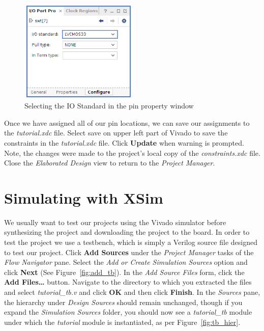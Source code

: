 \documentclass[11pt]{article}
\begin{document}
\begin{figure}[!h]
    \centering
    \includegraphics[width=0.5\textwidth]{images/io_std.png}
    \caption{Selecting the IO Standard in the pin property window}
    \label{fig:io_std}
\end{figure}

Once we have assigned all of our pin locations, we can save our assignments to the \textit{tutorial.xdc} file. Select save on upper left part of Vivado to save the constraints in the \textit{tutorial.xdc} file. Click \textbf{Update} when warning is prompted. Note, the changes were made to the project's local copy of the \textit{constraints.xdc} file. Close the \textit{Elaborated Design} view to return to the \textit{Project Manager}.




\section{Simulating with XSim}
\label{sec:simulation}
We usually want to test our projects using the Vivado simulator before synthesizing the project and downloading the project to the board. In order to test the project we use a testbench, which is simply a Verilog source file designed to test our project. Click \textbf{Add Sources} under the \textit{Project Manager} tasks of the \textit{Flow Navigator} pane. Select the \textit{Add or Create Simulation Sources} option and click \textbf{Next} (See Figure~\ref{fig:add_tb}). In the \textit{Add Source Files} form, click the \textbf{Add Files…} button. Navigate to the directory to which you extracted the files and select \textit{tutorial\_tb.v} and click \textbf{OK} and then click \textbf{Finish}. In the \textit{Sources} pane, the hierarchy under \textit{Design Sources} should remain unchanged, though if you expand the \textit{Simulation Sources} folder, you should now see a \textit{tutorial\_tb} module under which the \textit{tutorial} module is instantiated, as per Figure~\ref{fig:tb_hier}.
\end{document}
